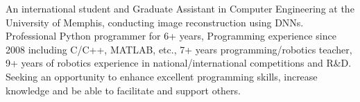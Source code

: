 
\begin{cvparagraph}

An international student and Graduate Assistant in Computer Engineering at the University of Memphis, conducting image reconstruction using DNNs. Professional Python programmer for 6+ years, Programming experience since 2008 including C/C++, MATLAB, etc., 7+ years programming/robotics teacher, 9+ years of robotics experience in national/international competitions and R&D. Seeking an opportunity to enhance excellent programming skills, increase knowledge and be able to facilitate and support others. 
\end{cvparagraph}